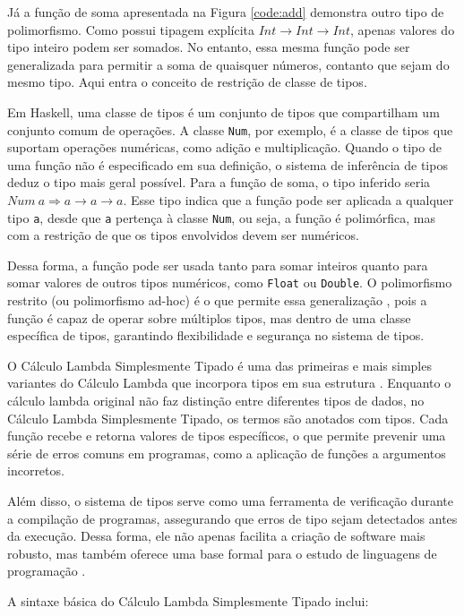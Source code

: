 Já a função de soma apresentada na Figura \ref{code:add} demonstra outro tipo de polimorfismo.
Como possui tipagem explícita $Int \rightarrow Int \rightarrow Int$, apenas valores do tipo inteiro podem ser somados.
No entanto, essa mesma função pode ser generalizada para permitir a soma de quaisquer números, contanto que sejam do mesmo tipo.
Aqui entra o conceito de restrição de classe de tipos.

Em Haskell, uma classe de tipos é um conjunto de tipos que compartilham um conjunto comum de operações.
A classe \texttt{Num}, por exemplo, é a classe de tipos que suportam operações numéricas, como adição e multiplicação.
Quando o tipo de uma função não é especificado em sua definição, o sistema de inferência de tipos deduz o tipo mais geral possível.
Para a função de soma, o tipo inferido seria $Num\ a \Rightarrow a \rightarrow a \rightarrow a$.
Esse tipo indica que a função pode ser aplicada a qualquer tipo \texttt{a}, desde que \texttt{a} pertença à classe \texttt{Num}, ou seja, a função é polimórfica, mas com a restrição de que os tipos envolvidos devem ser numéricos.

Dessa forma, a função pode ser usada tanto para somar inteiros quanto para somar valores de outros tipos numéricos, como \texttt{Float} ou \texttt{Double}.
O polimorfismo restrito (ou polimorfismo ad-hoc) é o que permite essa generalização \cite{PIERCE2002}, pois a função é capaz de operar sobre múltiplos tipos, mas dentro de uma classe específica de tipos, garantindo flexibilidade e segurança no sistema de tipos.

O Cálculo Lambda Simplesmente Tipado é uma das primeiras e mais simples variantes do Cálculo Lambda que incorpora tipos em sua estrutura \cite{CHURCH1940}.
Enquanto o cálculo lambda original não faz distinção entre diferentes tipos de dados, no Cálculo Lambda Simplesmente Tipado, os termos são anotados com tipos.
Cada função recebe e retorna valores de tipos específicos, o que permite prevenir uma série de erros comuns em programas, como a aplicação de funções a argumentos incorretos.

Além disso, o sistema de tipos serve como uma ferramenta de verificação durante a compilação de programas, assegurando que erros de tipo sejam detectados antes da execução.
Dessa forma, ele não apenas facilita a criação de software mais robusto, mas também oferece uma base formal para o estudo de linguagens de programação \cite{PIERCE2002}.

A sintaxe básica do Cálculo Lambda Simplesmente Tipado inclui:

